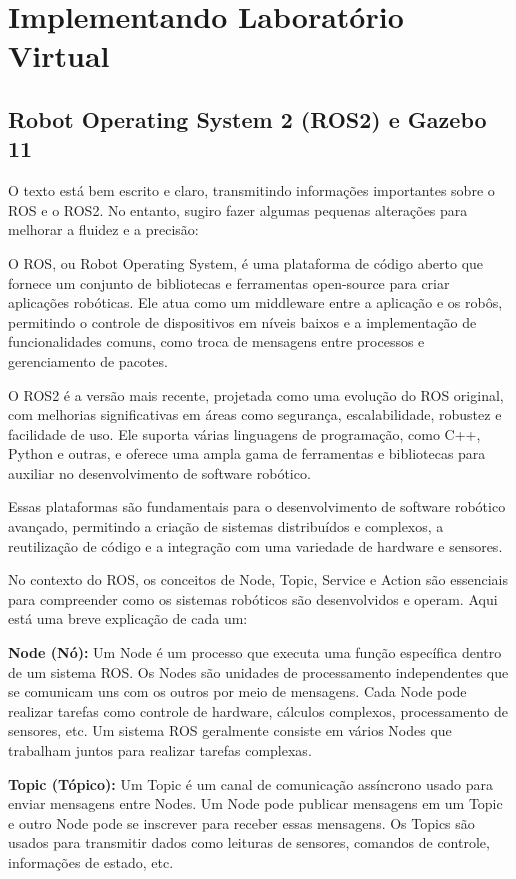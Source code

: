 \chapter{Implementando Laboratório Virtual}\label{cap:proposta}

\section{Robot Operating System 2 (ROS2) e Gazebo 11}

O texto está bem escrito e claro, transmitindo informações importantes sobre o ROS e o ROS2. No entanto, sugiro fazer algumas pequenas alterações para melhorar a fluidez e a precisão:

O ROS, ou Robot Operating System, é uma plataforma de código aberto que fornece um conjunto de bibliotecas e ferramentas open-source para criar aplicações robóticas. Ele atua como um middleware entre a aplicação e os robôs, permitindo o controle de dispositivos em níveis baixos e a implementação de funcionalidades comuns, como troca de mensagens entre processos e gerenciamento de pacotes.

O ROS2 é a versão mais recente, projetada como uma evolução do ROS original, com melhorias significativas em áreas como segurança, escalabilidade, robustez e facilidade de uso. Ele suporta várias linguagens de programação, como C++, Python e outras, e oferece uma ampla gama de ferramentas e bibliotecas para auxiliar no desenvolvimento de software robótico.

Essas plataformas são fundamentais para o desenvolvimento de software robótico avançado, permitindo a criação de sistemas distribuídos e complexos, a reutilização de código e a integração com uma variedade de hardware e sensores.

No contexto do ROS, os conceitos de Node, Topic, Service e Action são essenciais para compreender como os sistemas robóticos são desenvolvidos e operam. Aqui está uma breve explicação de cada um:

\textbf{Node (Nó):} Um Node é um processo que executa uma função específica dentro de um sistema ROS. Os Nodes são unidades de processamento independentes que se comunicam uns com os outros por meio de mensagens. Cada Node pode realizar tarefas como controle de hardware, cálculos complexos, processamento de sensores, etc. Um sistema ROS geralmente consiste em vários Nodes que trabalham juntos para realizar tarefas complexas.

\textbf{Topic (Tópico):} Um Topic é um canal de comunicação assíncrono usado para enviar mensagens entre Nodes. Um Node pode publicar mensagens em um Topic e outro Node pode se inscrever para receber essas mensagens. Os Topics são usados para transmitir dados como leituras de sensores, comandos de controle, informações de estado, etc.

